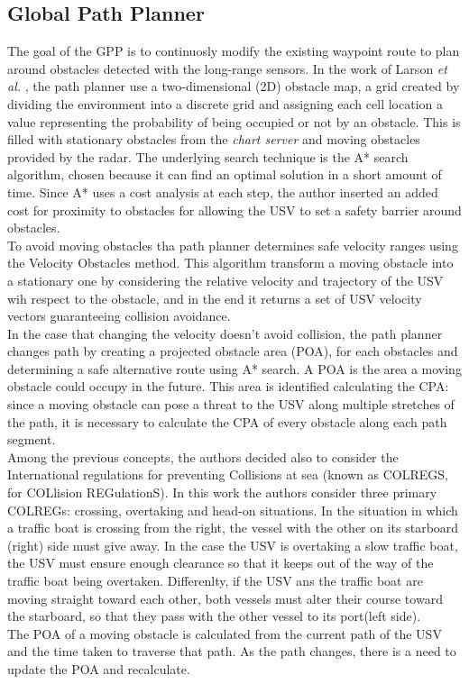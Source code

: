 \documentclass[journal]{IEEEtran}
\begin{document}
  \subsection{Global Path Planner} \label{gpp}
  The goal of the GPP is to continuosly modify the existing waypoint route to plan around obstacles detected with the long-range sensors. In the work of Larson \textit{et al.} \cite{Larson2007,Larson2007a}, the path planner use a two-dimensional (2D) obstacle map, a grid created by dividing the environment into a discrete grid and assigning each cell location a value representing the probability of being occupied or not by an obstacle. This is filled with stationary obstacles from the \textit{chart server} and moving obstacles provided by the radar. The underlying search technique is the A* search algorithm, chosen because it can find an optimal solution in a short amount of time. Since A* uses a cost analysis at each step, the author inserted an added cost for proximity to obstacles for allowing the USV to set a safety barrier around obstacles.\\
  To avoid moving obstacles tha path planner determines safe velocity ranges using the Velocity Obstacles method. This algorithm transform a moving obstacle into a stationary one by considering the relative velocity and trajectory of the USV wih respect to the obstacle, and in the end it returns a set of USV velocity vectors guaranteeing collision avoidance.\\
  In the case that changing the velocity doesn't avoid collision, the path planner changes path by creating a projected obstacle area (POA), for each obstacles and determining a safe alternative route using A* search. A POA is the area a moving obstacle could occupy in the future. This area is identified calculating the CPA: since a moving obstacle can pose a threat to the USV along multiple stretches of the path, it is necessary to calculate the CPA of every obstacle along each path segment.\\
  Among the previous concepts, the authors decided also to consider the International regulations for preventing Collisions at sea (known as COLREGS, for COLlision REGulationS). In this work the authors consider three primary COLREGs: crossing, overtaking and head-on situations. In the situation in which a traffic boat is crossing from the right, the vessel with the other on its starboard (right) side must give away. In the case the USV is overtaking a slow traffic boat, the USV must ensure enough clearance so that it keeps out of the way of the traffic boat being overtaken. Differenlty, if the USV ans the traffic boat are moving straight toward each other, both vessels must alter their course toward the starboard, so that they pass with the other vessel to its port(left side).\\
  The POA of a moving obstacle is calculated from the current path of the USV and the time taken to traverse that path. As the path changes, there is a need to update the POA and recalculate.
\end{document}
